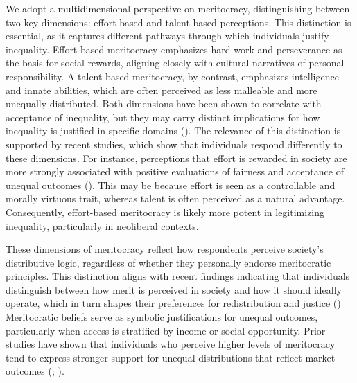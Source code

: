 \documentclass[
  12pt,
]{article}
\begin{document}
We adopt a multidimensional perspective on meritocracy, distinguishing
between two key dimensions: effort-based and talent-based perceptions.
This distinction is essential, as it captures different pathways through
which individuals justify inequality. Effort-based meritocracy
emphasizes hard work and perseverance as the basis for social rewards,
aligning closely with cultural narratives of personal responsibility. A
talent-based meritocracy, by contrast, emphasizes intelligence and
innate abilities, which are often perceived as less malleable and more
unequally distributed. Both dimensions have been shown to correlate with
acceptance of inequality, but they may carry distinct implications for
how inequality is justified in specific domains
().
The relevance of this distinction is supported by recent studies, which
show that individuals respond differently to these dimensions. For
instance, perceptions that effort is rewarded in society are more
strongly associated with positive evaluations of fairness and acceptance
of unequal outcomes (). This may be because effort is seen as a controllable and morally
virtuous trait, whereas talent is often perceived as a natural
advantage. Consequently, effort-based meritocracy is likely more potent
in legitimizing inequality, particularly in neoliberal contexts.

These dimensions of meritocracy reflect how respondents perceive
society's distributive logic, regardless of whether they personally
endorse meritocratic principles. This distinction aligns with recent
findings indicating that individuals distinguish between how merit is
perceived in society and how it should ideally operate, which in turn
shapes their preferences for redistribution and justice
() Meritocratic beliefs serve as symbolic justifications for unequal
outcomes, particularly when access is stratified by income or social
opportunity. Prior studies have shown that individuals who perceive
higher levels of meritocracy tend to express stronger support for
unequal distributions that reflect market outcomes
(;
).
\end{document}
